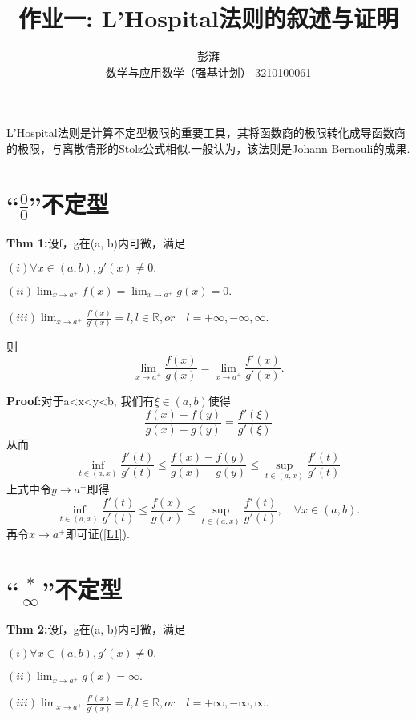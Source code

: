 \documentclass{ctexart}
\title{作业一: L'Hospital法则的叙述与证明}
\author{彭湃 \\ 数学与应用数学（强基计划） 3210100061}
\begin{document}
\maketitle

L'Hospital法则是计算不定型极限的重要工具，其将函数商的极限转化成导函数商的极限，与离散情形的Stolz公式相似.一般认为，该法则是Johann Bernouli的成果.



\section{“$\frac{0}{0}$”不定型}
\textbf{Thm 1:}设f，g在(a, b)内可微，满足

$(i)\forall x\in (a, b), g'(x)\neq0.$

$(ii)\lim_{x\rightarrow a^+} {f(x)}=\lim_{x\rightarrow a^+} {g(x)}=0.$

$(iii)\lim_{x\rightarrow a^+} {\frac{f'(x)}{g'(x)}}=l,  l\in \mathbb R, or \quad l=+\infty,-\infty, \infty.$

则
\begin{equation}
\lim_{x\rightarrow a^+} {\frac{f(x)}{g(x)}}=\lim_{x\rightarrow a^+} {\frac{f'(x)}{g'(x)}}.\tag{T1}\label{L1}
\end{equation}

\textbf{Proof:}对于a<x<y<b, 我们有$\xi\in(a,b)$使得
\begin{equation}
\frac{f(x)-f(y)}{g(x)-g(y)}=\frac{f'(\xi)}{g'(\xi)}\tag{1.1}
\end{equation}
从而
\begin{equation}
\inf_{t\in(a,x)}\frac{f'(t)}{g'(t)}\leq\frac{f(x)-f(y)}{g(x)-g(y)}\leq\sup_{t\in(a,x)}\frac{f'(t)}{g'(t)}\tag{1.2}
\end{equation}
上式中令$y\rightarrow a^+$即得
\begin{equation}
\inf_{t\in(a,x)}\frac{f'(t)}{g'(t)}\leq\frac{f(x)}{g(x)}\leq\sup_{t\in(a,x)}\frac{f'(t)}{g'(t)}, \quad\forall x\in(a, b).\tag{1.3}
\end{equation}
再令$x\rightarrow a^+$即可证(\ref{L1}).

\section{“$\frac{*}{\infty }$”不定型}
\textbf{Thm 2:}设f，g在(a, b)内可微，满足

$(i)\forall x\in (a, b), g'(x)\neq0.$

$(ii)\lim_{x\rightarrow a^+} {g(x)}=\infty.$

$(iii)\lim_{x\rightarrow a^+} {\frac{f'(x)}{g'(x)}}=l,  l\in \mathbb R, or \quad l=+\infty,-\infty, \infty.$
\end{document}
